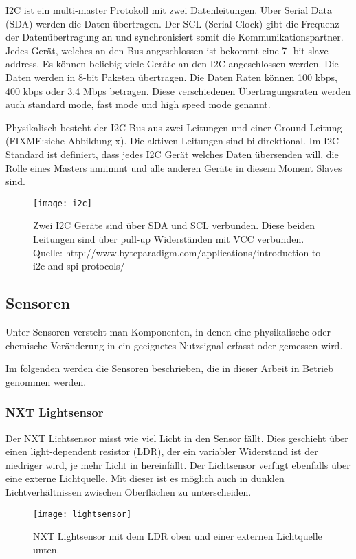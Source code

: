 I2C ist ein multi-master Protokoll mit zwei Datenleitungen. Über Serial Data (SDA) werden die Daten übertragen. Der SCL (Serial Clock) gibt die Frequenz der Datenübertragung an und synchronisiert somit die Kommunikationspartner. Jedes Gerät, welches an den Bus angeschlossen ist bekommt eine 7 -bit slave address. Es können beliebig viele Geräte an den I2C angeschlossen werden. Die Daten werden in 8-bit Paketen übertragen. Die Daten Raten können 100 kbps, 400 kbps oder 3.4 Mbps betragen. Diese verschiedenen Übertragungsraten werden auch standard mode, fast mode und high speed mode genannt.

Physikalisch besteht der I2C Bus aus zwei Leitungen und einer Ground Leitung (FIXME:siehe Abbildung x). Die aktiven Leitungen sind bi-direktional. Im I2C Standard ist definiert, dass jedes I2C Gerät welches Daten übersenden will, die Rolle eines Masters annimmt und alle anderen Geräte in diesem Moment Slaves sind.

\begin{figure}[h]
  \centering
  \texttt{[image: i2c]}
  \caption{Zwei I2C Geräte sind über SDA und SCL verbunden. Diese beiden Leitungen sind über pull-up Widerständen mit VCC verbunden. Quelle: http://www.byteparadigm.com/applications/introduction-to-i2c-and-spi-protocols/}
  \label{Kap1:I2C}
\end{figure}

\subsection{Sensoren}
Unter Sensoren versteht man Komponenten, in denen eine physikalische oder chemische Veränderung in ein geeignetes Nutzsignal erfasst oder gemessen wird. \cite{FIXME: }

Im folgenden werden die Sensoren beschrieben, die in dieser Arbeit in Betrieb genommen werden.

\subsubsection{NXT Lightsensor}
Der NXT Lichtsensor misst wie viel Licht  in den Sensor fällt. Dies geschieht über einen light-dependent resistor (LDR), der ein variabler Widerstand ist der niedriger wird, je mehr Licht in hereinfällt. Der Lichtsensor verfügt ebenfalls über eine externe Lichtquelle. Mit dieser ist es möglich auch in dunklen Lichtverhältnissen zwischen Oberflächen zu unterscheiden.

\begin{figure}[h]
  \centering
  \texttt{[image: lightsensor]}
  \caption{NXT Lightsensor mit dem LDR oben und einer externen Lichtquelle unten.}
  \label{Kap1:Lightsensor}
\end{figure}

